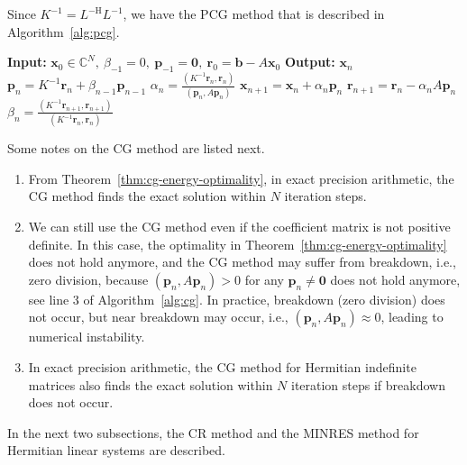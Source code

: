 {Since $K^{-1}=L^{-\mathrm H}L^{-1}$, we have the PCG method that is described in Algorithm\ \ref{alg:pcg}.}
\begin{algorithm}[H]\caption{{The preconditioned CG method}}\label{alg:pcg}
\begin{algorithmic}[1]
\Statex\textbf{Input:} $\bm x_0\in\mathbb C^N,\ \beta_{-1}=0,\ \bm p_{-1}=\bm0,\ \bm r_0=\bm b-A\bm x_0$
\Statex\textbf{Output:} $\bm x_n$
\State $\bm p_n=K^{-1}\bm r_n+\beta_{n-1}\bm p_{n-1}$
\State $\alpha_n=\frac{(K^{-1}\bm r_n,\bm r_n)}{(\bm p_n,A\bm p_n)}$
\State $\bm x_{n+1}=\bm x_n+\alpha_n\bm p_n$
\State $\bm r_{n+1}=\bm r_n-\alpha_nA\bm p_n$
\State $\beta_n=\frac{(K^{-1}\bm r_{n+1},\bm r_{n+1})}{(K^{-1}\bm r_n,\bm r_n)}$
\EndFor\end{algorithmic}\end{algorithm}
{Some notes on the CG method are listed next.}
\begin{enumerate}
\item {From Theorem\ \ref{thm:cg-energy-optimality}, in exact precision arithmetic, the CG method finds the exact solution within $N$ iteration steps.}
\item {We can still use the CG method even if the coefficient matrix is not positive definite. In this case, the optimality in Theorem\ \ref{thm:cg-energy-optimality} does not hold anymore, and the CG method may suffer from breakdown, i.e., zero division, because $(\bm p_n,A\bm p_n)>0$ for any $\bm p_n\ne\bm0$ does not hold anymore, see line 3 of Algorithm\ \ref{alg:cg}. In practice, breakdown (zero division) does not occur, but near breakdown may occur, i.e., $(\bm p_n,A\bm p_n)\approx0$, leading to numerical instability.}
\item {In exact precision arithmetic, the CG method for Hermitian indefinite matrices also finds the exact solution within $N$ iteration steps if breakdown does not occur.}
\end{enumerate}
{In the next two subsections, the CR method and the MINRES method for Hermitian linear systems are described.}
